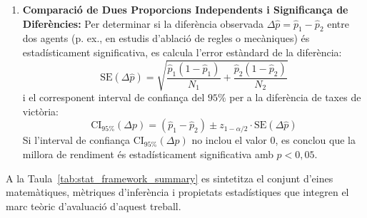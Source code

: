 \begin{enumerate}
    \item \textbf{Comparació de Dues Proporcions Independents i Significança de Diferències:}
          Per determinar si la diferència observada $\Delta \hat{p} = \hat{p}_1 - \hat{p}_2$ entre dos agents (p. ex., en estudis d'ablació de regles o mecàniques) és estadísticament significativa, es calcula l'error estàndard de la diferència:
          \begin{equation}
              \mathrm{SE}(\Delta \hat{p}) = \sqrt{\frac{\hat{p}_1(1-\hat{p}_1)}{N_1} + \frac{\hat{p}_2(1-\hat{p}_2)}{N_2}}
              \label{eq:se_diff}
          \end{equation}
          i el corresponent interval de confiança del $95\%$ per a la diferència de taxes de victòria:
          \begin{equation}
              \mathrm{CI}_{95\%}(\Delta p) = (\hat{p}_1 - \hat{p}_2) \pm z_{1-\alpha/2} \cdot \mathrm{SE}(\Delta \hat{p})
              \label{eq:ci_diff}
          \end{equation}
          Si l'interval de confiança $\mathrm{CI}_{95\%}(\Delta p)$ no inclou el valor $0$, es conclou que la millora de rendiment és estadísticament significativa amb $p < 0{,}05$.
\end{enumerate}

A la Taula~\ref{tab:stat_framework_summary} es sintetitza el conjunt d'eines matemàtiques, mètriques d'inferència i propietats estadístiques que integren el marc teòric d'avaluació d'aquest treball.

